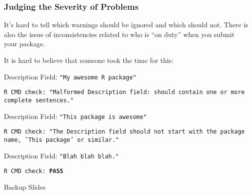 \documentclass[12 pt]{beamer}\usepackage[]{graphicx}\usepackage[]{color}
\begin{document}
\begin{frame}[fragile]
\frametitle{Judging the Severity of Problems}

It's hard to tell which warnings should be ignored and which should not. There is also the issue of inconsistencies related to who is ``on duty'' when you submit your package.

\vspace{.1in}

It is hard to believe that someone took the time for this:

\vspace{.15in}
\begin{footnotesize}
Description Field: {\tt "My awesome R package"}

{\tt R CMD check: "{\color{red}Malformed Description field: should contain one or more complete sentences.}"}

\vspace{.15in}

Description Field: {\tt "This package is awesome"}

{\tt R CMD check: "{\color{red}The Description field should not start with the package name, 'This package' or similar.}"}

\vspace{.15in}

Description Field: {\tt "Blah blah blah."}

{\tt R CMD check: {\color{green}\bf PASS}}
\end{footnotesize}

\end{frame}




\begin{frame}[plain]
\begin{center}
\LARGE Backup Slides
\end{center}
\end{frame}


\end{document}
